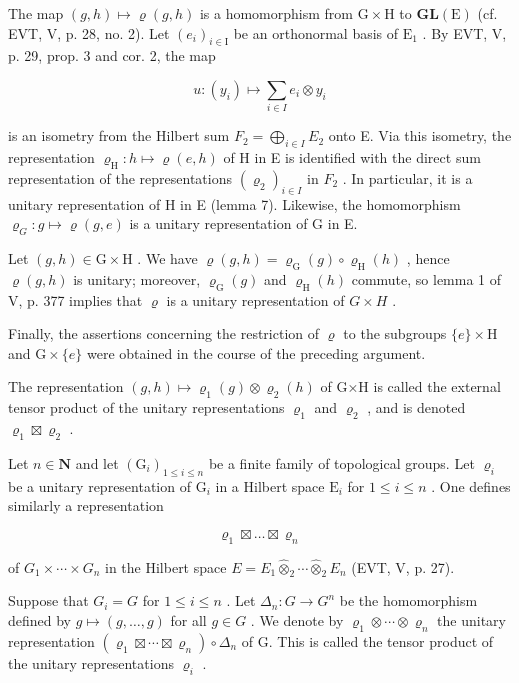 The map \((g,h)\mapsto\varrho(g,h)\) is a homomorphism from \(\mathrm{G}\times\mathrm{H}\) to \(\mathbf{GL}(\mathrm{E})\) (cf. EVT, V, p. 28, no. 2). Let \((e_{i})_{i\in\mathrm{I}}\) be an orthonormal basis of \(\mathrm{E}_{1}\) . By EVT, V, p. 29, prop. 3 and cor. 2, the map

\[
u \colon (y _ {i}) \mapsto \sum_ {i \in I} e _ {i} \otimes y _ {i}
\]

is an isometry from the Hilbert sum \(F_{2} = \bigoplus_{i \in I} E_{2}\) onto E. Via this isometry, the representation \(\varrho_{\mathrm{H}} \colon h \mapsto \varrho(e, h)\) of H in E is identified with the direct sum representation of the representations \((\varrho_{2})_{i\in I}\) in \(F_{2}\) . In particular, it is a unitary representation of H in E (lemma 7). Likewise, the homomorphism \(\varrho_{G}: g \mapsto \varrho(g,e)\) is a unitary representation of G in E.

Let \((g,h)\in\mathrm{G}\times\mathrm{H}\) . We have \(\varrho(g,h)=\varrho_{\mathrm{G}}(g)\circ\varrho_{\mathrm{H}}(h)\) , hence \(\varrho(g,h)\) is unitary; moreover, \(\varrho_{\mathrm{G}}(g)\) and \(\varrho_{\mathrm{H}}(h)\) commute, so lemma 1 of V, p. 377 implies that \(\varrho\) is a unitary representation of \(G\times H\) .

Finally, the assertions concerning the restriction of \(\varrho\) to the subgroups \(\{e\} \times \mathrm{H}\) and \(\mathrm{G} \times \{e\}\) were obtained in the course of the preceding argument.

The representation \((g,h)\mapsto\varrho_{1}(g)\otimes\varrho_{2}(h)\) of G×H is called the external tensor product of the unitary representations \(\varrho_{1}\) and \(\varrho_{2}\) , and is denoted \(\varrho_{1}\boxtimes\varrho_{2}\) .

Let \(n \in \mathbf{N}\) and let \((\mathrm{G}_i)_{1 \leqslant i \leqslant n}\) be a finite family of topological groups. Let \(\varrho_i\) be a unitary representation of \(\mathrm{G}_i\) in a Hilbert space \(\mathrm{E}_i\) for \(1 \leqslant i \leqslant n\) . One defines similarly a representation

\[
\varrho_ {1} \boxtimes \dots \boxtimes \varrho_ {n}
\]

of \(G_{1} \times \cdots \times G_{n}\) in the Hilbert space \(E = E_{1} \widehat{\otimes}_{2} \cdots \widehat{\otimes}_{2} E_{n}\) (EVT, V, p. 27).

Suppose that \(G_{i} = G\) for \(1 \leqslant i \leqslant n\) . Let \(\Delta_{n}: G \to G^{n}\) be the homomorphism defined by \(g \mapsto (g, \ldots, g)\) for all \(g \in G\) . We denote by \(\varrho_{1} \otimes \cdots \otimes \varrho_{n}\) the unitary representation \((\varrho_{1} \boxtimes \cdots \boxtimes \varrho_{n}) \circ \Delta_{n}\) of G. This is called the tensor product of the unitary representations \(\varrho_{i}\) .

